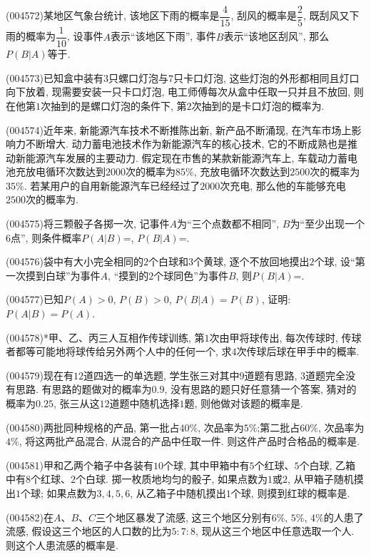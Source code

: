 \item (004572)某地区气象台统计, 该地区下雨的概率是$\dfrac 4{15}$, 刮风的概率是$\dfrac 25$, 既刮风又下雨的概率为$\dfrac 1{10}$, 设事件$A$表示``该地区下雨'', 事件$B$表示``该地区刮风'', 那么$P(B|A)$等于.
\item (004573)已知盒中装有$3$只螺口灯泡与$7$只卡口灯泡, 这些灯泡的外形都相同且灯口向下放着, 现需要安装一只卡口灯泡, 电工师傅每次从盒中任取一只并且不放回, 则在他第$1$次抽到的是螺口灯泡的条件下, 第$2$次抽到的是卡口灯泡的概率为.
\item (004574)近年来, 新能源汽车技术不断推陈出新, 新产品不断涌现, 在汽车市场上影响力不断增大. 动力蓄电池技术作为新能源汽车的核心技术, 它的不断成熟也是推动新能源汽车发展的主要动力. 假定现在市售的某款新能源汽车上, 车载动力蓄电池充放电循环次数达到$2000$次的概率为$85\%$, 充放电循环次数达到$2500$次的概率为$35\%$. 若某用户的自用新能源汽车已经经过了$2000$次充电, 那么他的车能够充电$2500$次的概率为.
\item (004575)将三颗骰子各掷一次, 记事件$A$为``三个点数都不相同'', $B$为``至少出现一个$6$点'', 则条件概率$P(A|B)$=, $P(B|A)$=.
\item (004576)袋中有大小完全相同的$2$个白球和$3$个黄球, 逐个不放回地摸出$2$个球, 设``第一次摸到白球''为事件$A$, ``摸到的$2$个球同色''为事件$B$, 则$P(B|A)$=.
\item (004577)已知$P(A)>0$, $P(B)>0$, $P(B|A)=P(B)$, 证明: $P(A|B)=P(A)$.
\item (004578)*甲、乙、丙三人互相作传球训练, 第$1$次由甲将球传出, 每次传球时, 传球者都等可能地将球传给另外两个人中的任何一个, 求$4$次传球后球在甲手中的概率.
\item (004579)现在有$12$道四选一的单选题, 学生张三对其中$9$道题有思路, $3$道题完全没有思路. 有思路的题做对的概率为$0.9$, 没有思路的题只好任意猜一个答案, 猜对的概率为$0.25$, 张三从这$12$道题中随机选择$1$题, 则他做对该题的概率是.
\item (004580)两批同种规格的产品, 第一批占$40\%$, 次品率为$5\%$;第二批占$60\%$, 次品率为$4\%$, 将这两批产品混合, 从混合的产品中任取一件. 则这件产品时合格品的概率是.
\item (004581)甲和乙两个箱子中各装有$10$个球, 其中甲箱中有$5$个红球、$5$个白球, 乙箱中有$8$个红球、$2$个白球. 掷一枚质地均匀的骰子, 如果点数为$1$或$2$, 从甲箱子随机摸出$1$个球; 如果点数为$3, 4, 5, 6$, 从乙箱子中随机摸出$1$个球, 则摸到红球的概率是.
\item (004582)在$A$、$B$、$C$三个地区暴发了流感, 这三个地区分别有$6\%$, $5\%$, $4\%$的人患了流感, 假设这三个地区的人口数的比为$5: 7: 8$, 现从这三个地区中任意选取一个人. 则这个人患流感的概率是.
